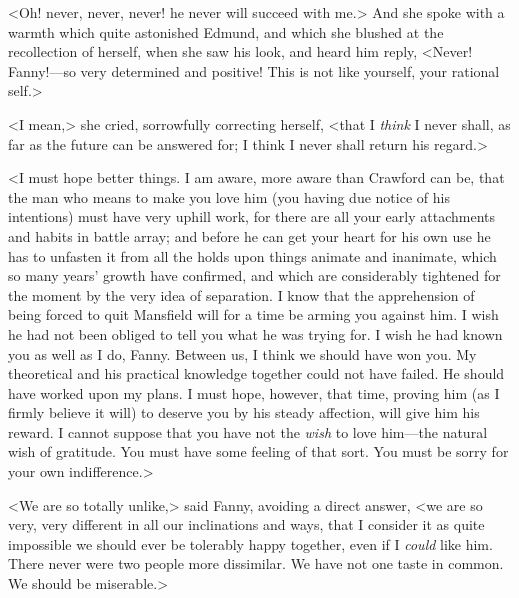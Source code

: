 <Oh! never, never, never! he never will succeed with me.> And she spoke with a warmth which quite astonished Edmund, and which she blushed at the recollection of herself, when she saw his look, and heard him reply, <Never! Fanny!—so very determined and positive! This is not like yourself, your rational self.>

<I mean,> she cried, sorrowfully correcting herself, <that I \textit{think}  I never shall, as far as the future can be answered for; I think I never shall return his regard.>

<I must hope better things. I am aware, more aware than Crawford can be, that the man who means to make you love him (you having due notice of his intentions) must have very uphill work, for there are all your early attachments and habits in battle array; and before he can get your heart for his own use he has to unfasten it from all the holds upon things animate and inanimate, which so many years' growth have confirmed, and which are considerably tightened for the moment by the very idea of separation. I know that the apprehension of being forced to quit Mansfield will for a time be arming you against him. I wish he had not been obliged to tell you what he was trying for. I wish he had known you as well as I do, Fanny. Between us, I think we should have won you. My theoretical and his practical knowledge together could not have failed. He should have worked upon my plans. I must hope, however, that time, proving him (as I firmly believe it will) to deserve you by his steady affection, will give him his reward. I cannot suppose that you have not the \textit{wish}  to love him—the natural wish of gratitude. You must have some feeling of that sort. You must be sorry for your own indifference.>

<We are so totally unlike,> said Fanny, avoiding a direct answer, <we are so very, very different in all our inclinations and ways, that I consider it as quite impossible we should ever be tolerably happy together, even if I \textit{could}  like him. There never were two people more dissimilar. We have not one taste in common. We should be miserable.>

